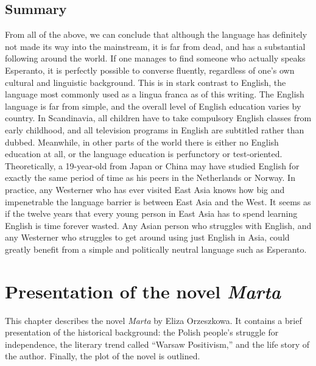 \section{Summary}
From all of the above, we can conclude that although the language has definitely not made its way into the mainstream, it is far from dead, and has a substantial following around the world.
If one manages to find someone who actually speaks Esperanto, it is perfectly possible to converse fluently, regardless of one's own cultural and linguistic background.
This is in stark contrast to English, the language most commonly used as a lingua franca as of this writing.
The English language is far from simple, and the overall level of English education varies by country.
In Scandinavia, all children have to take compulsory English classes from early childhood, and all television programs in English are subtitled rather than dubbed.
Meanwhile, in other parts of the world there is either no English education at all, or the language education is perfunctory or test-oriented.
Theoretically, a 19-year-old from Japan or China may have studied English for exactly the same period of time as his peers in the Netherlands or Norway.
In practice, any Westerner who has ever visited East Asia knows how big and impenetrable the language barrier is between East Asia and the West.
It seems as if the twelve years that every young person in East Asia has to spend learning English is time forever wasted.
Any Asian person who struggles with English, and any Westerner who struggles to get around using just English in Asia, could greatly benefit from a simple and politically neutral language such as Esperanto.


\chapter{Presentation of the novel \textit{Marta}}
This chapter describes the novel \textit{Marta} by Eliza Orzeszkowa.
It contains a brief presentation of the historical background: the Polish people's struggle for independence, the literary trend called ``Warsaw Positivism,'' and the life story of the author.
Finally, the plot of the novel is outlined.

